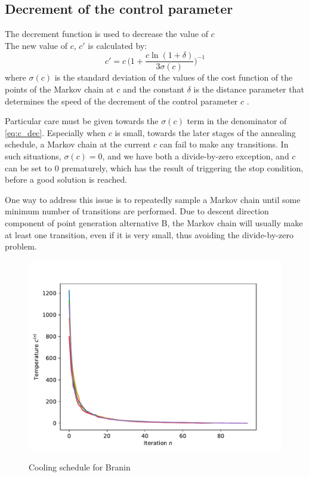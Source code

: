 \subsection{Decrement of the control parameter}
The decrement function is used to decrease the value of $c$\\
The new value of $c$, $c'$ is calculated by:
\begin{equation}\label{eq:c_dec}
    c'=c \, \Bigg(1+\dfrac{c\ln(1+\delta)}{3\sigma (c)}\Bigg)^{-1} 
\end{equation} 
where $\sigma(c)$ is the standard deviation of the values of the cost function of the points of the Markov chain at $c$ and the constant $\delta$ is the distance parameter that determines the speed of the decrement of the control parameter $c$ \cite{dekkers}.

Particular care must be given towards the $\sigma(c)$ term in the denominator of \cref{eq:c_dec}. Especially when $c$ is small, towards
the later stages of the annealing schedule, a Markov chain at the current $c$ can fail to make any transitions. In such situations,
$\sigma(c) = 0$, and we have both a divide-by-zero exception, and $c$ can be set to 0 prematurely, which has the result of triggering
the stop condition, before a good solution is reached.

One way to address this issue is to repeatedly sample a Markov chain until some minimum number of transitions are performed. Due to
descent direction component of point generation alternative B, the Markov chain will usually make at least one transition, even
if it is very small, thus avoiding the divide-by-zero problem.

\begin{figure}[h]
    \centering
    \caption{Cooling schedule for Branin}
    \includegraphics[scale=0.42]{figures/fig31-branin.pdf}
    \label{fig:512}
\end{figure}

